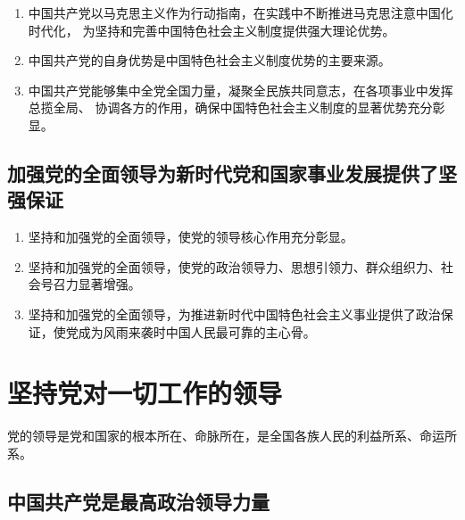\documentclass[UTF8,10pt]{ctexbook} %
\begin{document}
\begin{enumerate}[itemsep=0pt]
    \item 中国共产党以马克思主义作为行动指南，在实践中不断推进马克思注意中国化时代化，
    为坚持和完善中国特色社会主义制度提供强大理论优势。
    \item 中国共产党的自身优势是中国特色社会主义制度优势的主要来源。
    \item 中国共产党能够集中全党全国力量，凝聚全民族共同意志，在各项事业中发挥总揽全局、
    协调各方的作用，确保中国特色社会主义制度的显著优势充分彰显。
\end{enumerate}

\subsection{加强党的全面领导为新时代党和国家事业发展提供了坚强保证}

\begin{enumerate}[itemsep=0pt]
    \item 坚持和加强党的全面领导，使党的领导核心作用充分彰显。
    \item 坚持和加强党的全面领导，使党的政治领导力、思想引领力、群众组织力、社会号召力显著增强。
    \item 坚持和加强党的全面领导，为推进新时代中国特色社会主义事业提供了政治保证，使党成为风雨来袭时中国人民最可靠的主心骨。
\end{enumerate}

\section{坚持党对一切工作的领导}

党的领导是党和国家的根本所在、命脉所在，是全国各族人民的利益所系、命运所系。

\subsection{中国共产党是最高政治领导力量}
\end{document}
